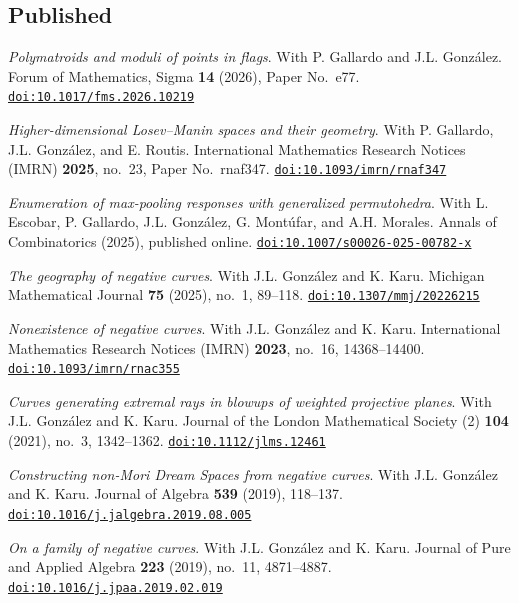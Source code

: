 \documentclass[11pt]{article}
\newcommand{\doi}[1]{\href{https://doi.org/#1}{\texttt{doi:#1}}}
\newcommand{\pubspacing}{\setlength{\itemsep}{3pt}\setlength{\parsep}{0pt}\raggedright}
\begin{document}
\subsection*{Published}
\begin{etaremune}[start=8]\pubspacing
  \item \emph{Polymatroids and moduli of points in flags}.
        With P. Gallardo and J.L. González.
        Forum of Mathematics, Sigma \textbf{14} (2026), Paper No.~e77.
        \doi{10.1017/fms.2026.10219}

  \item \emph{Higher-dimensional Losev--Manin spaces and their geometry}.
        With P. Gallardo, J.L. González, and E. Routis.
        International Mathematics Research Notices (IMRN) \textbf{2025}, no.~23, Paper No.~rnaf347.
        \doi{10.1093/imrn/rnaf347}

  \item \emph{Enumeration of max-pooling responses with generalized permutohedra}.
        With L. Escobar, P. Gallardo, J.L. González, G. Montúfar, and A.H. Morales.
        Annals of Combinatorics (2025), published online.
        \doi{10.1007/s00026-025-00782-x}

  \item \emph{The geography of negative curves}.
        With J.L. González and K. Karu.
        Michigan Mathematical Journal \textbf{75} (2025), no.~1, 89--118.
        \doi{10.1307/mmj/20226215}

  \item \emph{Nonexistence of negative curves}.
        With J.L. González and K. Karu.
        International Mathematics Research Notices (IMRN) \textbf{2023}, no.~16, 14368--14400.
        \doi{10.1093/imrn/rnac355}

  \item \emph{Curves generating extremal rays in blowups of weighted projective planes}.
        With J.L. González and K. Karu.
        Journal of the London Mathematical Society (2) \textbf{104} (2021), no.~3, 1342--1362.
        \doi{10.1112/jlms.12461}

  \item \emph{Constructing non-Mori Dream Spaces from negative curves}.
        With J.L. González and K. Karu.
        Journal of Algebra \textbf{539} (2019), 118--137.
        \doi{10.1016/j.jalgebra.2019.08.005}

  \item \emph{On a family of negative curves}.
        With J.L. González and K. Karu.
        Journal of Pure and Applied Algebra \textbf{223} (2019), no.~11, 4871--4887.
        \doi{10.1016/j.jpaa.2019.02.019}
\end{etaremune}
\end{document}
